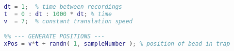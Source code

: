 \begin{lstlisting}[language=matlab]
%% --- INITIALIZE ---
dt = 1;  % time between recordings
t  = 0 : dt : 1000 * dt; % time
v  = 7;  % constant translation speed

%% --- GENERATE POSITIONS ---
xPos = v*t + randn( 1, sampleNumber ); % position of bead in trap

\end{lstlisting}